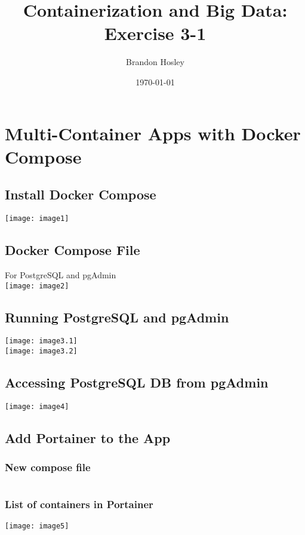 \documentclass[]{article}
\title{Containerization and Big Data: Exercise 3-1}
\author{Brandon Hosley}
\date{\today}
\begin{document}
\maketitle

\setcounter{section}{2}
\section{Multi-Container Apps with Docker Compose}
\subsection{Install Docker Compose}
	\texttt{[image: image1]} \\
\subsection{Docker Compose File}
	For PostgreSQL and pgAdmin \\
	\texttt{[image: image2]} \\
\subsection{Running PostgreSQL and pgAdmin}
	\texttt{[image: image3.1]} \\
	\texttt{[image: image3.2]} \\
\subsection{Accessing PostgreSQL DB from pgAdmin}
	\texttt{[image: image4]} \\
	
\clearpage

\subsection{Add Portainer to the App}
	\subsubsection{New compose file}
		\inputminted[baselinestretch=1.2, bgcolor=light-gray, fontsize=\footnotesize]{qml}{docker-compose.yml}
	\subsubsection{List of containers in Portainer}
		\texttt{[image: image5]} \\	

\end{document}
